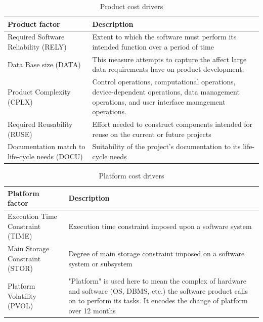 \begin{table}[H]
\centering
\begin{tabular}{ p{} | p{}}
\textbf{Product factor} & \textbf{Description} \\ \hline
Required Software Reliability (RELY) & Extent to which the software must perform its intended function over a period of time \\ \hline
Data Base size (DATA) & This measure attempts to capture the affect large data requirements have on product development. \\ \hline
Product Complexity (CPLX) & Control operations, computational operations, device-dependent operations, data management operations, and user interface management operations. \\ \hline
Required Reusability (RUSE) &  Effort needed to construct components intended for reuse on the current or future projects \\ \hline
Documentation match to life-cycle needs (DOCU) & Suitability of the project's documentation to its life-cycle needs
\end{tabular}
\caption{Product cost drivers}
\end{table}

\begin{table}[H]
\centering
\begin{tabular}{p{} | p{}}
\textbf{Platform factor} & \textbf{Description}\\ \hline 
Execution Time Constraint (TIME) & Execution time constraint imposed upon a software system \\ \hline
Main Storage Constraint (STOR) & Degree of main storage constraint imposed on a software system or subsystem \\ \hline
Platform Volatility (PVOL) & "Platform" is used here to mean the complex of hardware and software (OS, DBMS, etc.) the software product calls on to perform its tasks. It encodes the change of platform over 12 months
\end{tabular}
\caption{Platform cost drivers}
\end{table}

